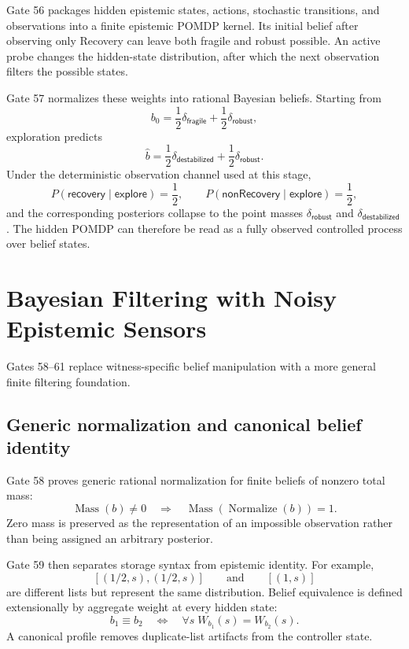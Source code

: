 Gate 56 packages hidden epistemic states, actions, stochastic transitions, and observations into a finite epistemic POMDP kernel. Its initial belief after observing only Recovery can leave both \textsf{fragile} and \textsf{robust} possible. An active probe changes the hidden-state distribution, after which the next observation filters the possible states.

Gate 57 normalizes these weights into rational Bayesian beliefs. Starting from
\[
b_0=\frac12\delta_{\textsf{fragile}}+\frac12\delta_{\textsf{robust}},
\]
exploration predicts
\[
\widehat b=\frac12\delta_{\textsf{destabilized}}+\frac12\delta_{\textsf{robust}}.
\]
Under the deterministic observation channel used at this stage,
\[
P(\textsf{recovery}\mid\textsf{explore})=\frac12,
\qquad
P(\textsf{nonRecovery}\mid\textsf{explore})=\frac12,
\]
and the corresponding posteriors collapse to the point masses $\delta_{\textsf{robust}}$ and $\delta_{\textsf{destabilized}}$. The hidden POMDP can therefore be read as a fully observed controlled process over belief states.

\section{Bayesian Filtering with Noisy Epistemic Sensors}

Gates 58--61 replace witness-specific belief manipulation with a more general finite filtering foundation.

\subsection{Generic normalization and canonical belief identity}

Gate 58 proves generic rational normalization for finite beliefs of nonzero total mass:
\[
\operatorname{Mass}(b)\neq0
\quad\Longrightarrow\quad
\operatorname{Mass}(\operatorname{Normalize}(b))=1.
\]
Zero mass is preserved as the representation of an impossible observation rather than being assigned an arbitrary posterior.

Gate 59 then separates storage syntax from epistemic identity. For example,
\[
[(1/2,s),(1/2,s)]
\qquad\text{and}\qquad
[(1,s)]
\]
are different lists but represent the same distribution. Belief equivalence is defined extensionally by aggregate weight at every hidden state:
\[
b_1\equiv b_2
\quad\Longleftrightarrow\quad
\forall s\; W_{b_1}(s)=W_{b_2}(s).
\]
A canonical profile removes duplicate-list artifacts from the controller state.

